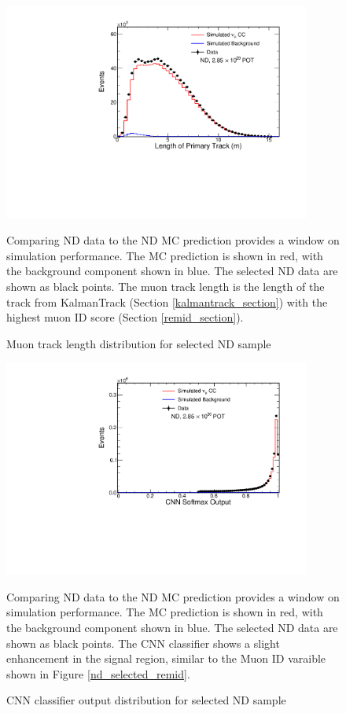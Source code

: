 \begin{figure}
\begin{center}
\includegraphics[width=0.9\textwidth]{figures/selection_nd/trkLength_NumuContainND_CVN.pdf}
\end{center}
\caption{Muon track length distribution for selected ND sample}{
Comparing ND data to the ND MC prediction provides a window on simulation
performance.  The MC prediction is shown in red, with the background
component shown in blue.
The selected ND data are shown as black points.
The muon track length is the length of the track from KalmanTrack (Section
\ref{kalmantrack_section})
with the highest muon ID score (Section \ref{remid_section}).
}
\label{nd_selected_trkLen}
\end{figure}

\begin{figure}
\begin{center}
\includegraphics[width=0.9\textwidth]{figures/selection_nd/cvnmu_NumuContainND_CVN.pdf}
\end{center}
\caption{CNN classifier output distribution for selected ND sample}{
Comparing ND data to the ND MC prediction provides a window on simulation
performance.  The MC prediction is shown in red, with the background
component shown in blue.
The selected ND data are shown as black points.
The CNN classifier shows a slight enhancement in the signal region, similar
to the Muon ID varaible shown in Figure \ref{nd_selected_remid}.}
\label{nd_selected_cvnmu}
\end{figure}



